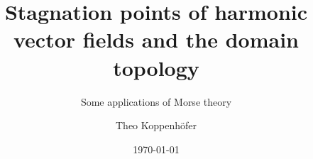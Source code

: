 





\title{Stagnation points of harmonic vector fields and the domain topology}
\subtitle{Some applications of Morse theory}
\author{Theo Koppenhöfer}
\date{\today}


\graphicspath{{../Art/}}
\graphicspath{{../Plots/}}
\graphicspath{{../Figures/}}

\tikzexternaldisable


\usepackage{transparent}

\newcommand{\openX}{\interior\brk*{X}}
\newcommand{\questionFlowthrough}{\begin{question}[Flowthrough with stagnation point] \label{qu:flowthroughStagnationPoint}
    Does there exist a domain $X\subset\R^d$ homeomorphic to a ball and a harmonic vector field $u\colon X\to\R^d$ such that
    \begin{enumerate}
      \item $u$ has an interior stagnation point
      \item the boundaries on which $u$ enters and leaves the region are connected?
    \end{enumerate}
\end{question}}





{
\frame[plain]{\titlepage}
}

